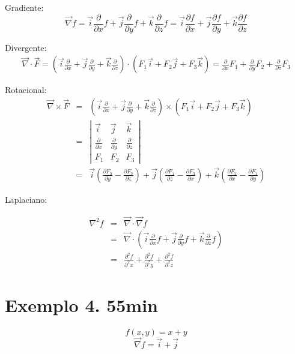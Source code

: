 \documentclass[a4paper,10pt]{book}
\begin{document}
 Gradiente:
 $$\vec{\nabla}f=\vec{i}\frac{\partial}{\partial x}f+\vec{j}\frac{\partial}{\partial y}f+\vec{k}\frac{\partial}{\partial z}f=\vec{i}\frac{\partial f}{\partial x}+\vec{j}\frac{\partial f}{\partial y}+\vec{k}\frac{\partial f}{\partial z}$$
 
 Divergente:
 \begin{eqnarray*}
\vec{\nabla}\cdot\vec{F}=\left(\vec{i}\frac{\partial}{\partial x}+\vec{j}\frac{\partial}{\partial y}+\vec{k}\frac{\partial}{\partial z}\right)\cdot\left(F_1\vec{i}+F_2\vec{j}+F_3\vec{k}\right)=  \frac{\partial}{\partial x}F_1+\frac{\partial}{\partial y}F_2 +\frac{\partial}{\partial z}F_3
 \end{eqnarray*}

 Rotacional:
 \begin{eqnarray*}
\vec{\nabla}\times\vec{F}&=&\left(\vec{i}\frac{\partial}{\partial x}+\vec{j}\frac{\partial}{\partial y}+\vec{k}\frac{\partial}{\partial z}\right)\times\left(F_1\vec{i}+F_2\vec{j}+F_3\vec{k}\right)\\
&=&\left|
\begin{array}{ccc}
\vec{i}&\vec{j}&\vec{k} \\
\frac{\partial}{\partial x } & \frac{\partial}{\partial y } &\frac{\partial}{\partial z } \\
F_1&F_2&F_3
\end{array}
\right|\\
&=&
\vec{i}\left(\frac{\partial F_3}{\partial y}-\frac{\partial F_2}{\partial z}\right)
+\vec{j}\left(\frac{\partial F_1}{\partial z}-\frac{\partial F_3}{\partial x}\right)
+\vec{k}\left(\frac{\partial F_2}{\partial x}-\frac{\partial F_1}{\partial y}\right)
 \end{eqnarray*}

 Laplaciano:
 
 \begin{eqnarray*}
\nabla^2f &=& \vec{\nabla}\cdot\vec{\nabla}f \\
&=&\vec{\nabla}\cdot\left( \vec{i}\frac{\partial}{\partial x}f+\vec{j}\frac{\partial}{\partial y}f +\vec{k}\frac{\partial}{\partial z}f\right)\\
&=&\frac{\partial^2 f}{\partial^2 x}+\frac{\partial^2 f}{\partial^2 y}+\frac{\partial^2 f}{\partial^2 z}
 \end{eqnarray*}

 
\section{Exemplo 4. 55min}
$$f(x,y)=x+y$$
$$\vec{\nabla}f = \vec{i} +\vec{j}$$
 
\end{document}
